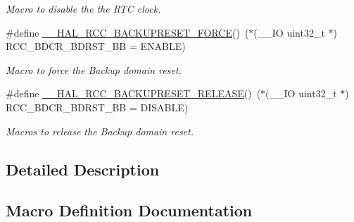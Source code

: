 \begin{DoxyCompactItemize}
\begin{DoxyCompactList}\small\item\em Macro to disable the the R\+TC clock. \end{DoxyCompactList}\item 
\#define \hyperlink{group___r_c_c___r_t_c___clock___configuration_ga3bf7da608ff985873ca8e248fb1dc4f0}{\+\_\+\+\_\+\+H\+A\+L\+\_\+\+R\+C\+C\+\_\+\+B\+A\+C\+K\+U\+P\+R\+E\+S\+E\+T\+\_\+\+F\+O\+R\+CE}()~($\ast$(\+\_\+\+\_\+\+IO uint32\+\_\+t $\ast$) R\+C\+C\+\_\+\+B\+D\+C\+R\+\_\+\+B\+D\+R\+S\+T\+\_\+\+BB = E\+N\+A\+B\+LE)
\begin{DoxyCompactList}\small\item\em Macro to force the Backup domain reset. \end{DoxyCompactList}\item 
\mbox{\label{group___r_c_c___r_t_c___clock___configuration_ga14f32622c65f4ae239ba8cb00d510321}} 
\#define \hyperlink{group___r_c_c___r_t_c___clock___configuration_ga14f32622c65f4ae239ba8cb00d510321}{\+\_\+\+\_\+\+H\+A\+L\+\_\+\+R\+C\+C\+\_\+\+B\+A\+C\+K\+U\+P\+R\+E\+S\+E\+T\+\_\+\+R\+E\+L\+E\+A\+SE}()~($\ast$(\+\_\+\+\_\+\+IO uint32\+\_\+t $\ast$) R\+C\+C\+\_\+\+B\+D\+C\+R\+\_\+\+B\+D\+R\+S\+T\+\_\+\+BB = D\+I\+S\+A\+B\+LE)
\begin{DoxyCompactList}\small\item\em Macros to release the Backup domain reset. \end{DoxyCompactList}\end{DoxyCompactItemize}


\subsection{Detailed Description}


\subsection{Macro Definition Documentation}
\mbox{\label{group___r_c_c___r_t_c___clock___configuration_ga3bf7da608ff985873ca8e248fb1dc4f0}} 
